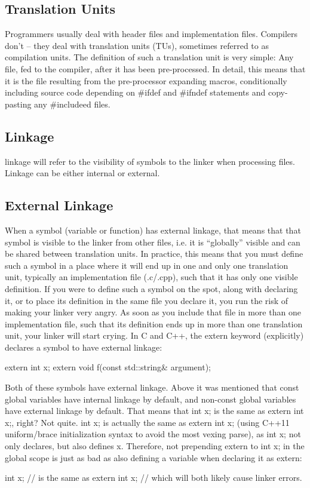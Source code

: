 \documentclass{report}
\begin{document}
\begin{concept}
    \bigbreak \noindent 
    \subsection{Translation Units}
    \bigbreak \noindent 
    Programmers usually deal with header files and implementation files. Compilers don’t – they deal with translation units (TUs), sometimes referred to as compilation units. The definition of such a translation unit is very simple: Any file, fed to the compiler, after it has been pre-processed. In detail, this means that it is the file resulting from the pre-processor expanding macros, conditionally including source code depending on #ifdef and \#ifndef statements and copy-pasting any \#includeed files.
    \bigbreak \noindent 
    \subsection{Linkage}
    \bigbreak \noindent 
    linkage will refer to the visibility of symbols to the linker when processing files. Linkage can be either internal or external.
    \bigbreak \noindent 
    \subsection{External Linkage}
    \bigbreak \noindent 
    When a symbol (variable or function) has external linkage, that means that that symbol is visible to the linker from other files, i.e. it is “globally” visible and can be shared between translation units. In practice, this means that you must define such a symbol in a place where it will end up in one and only one translation unit, typically an implementation file (.c/.cpp), such that it has only one visible definition. If you were to define such a symbol on the spot, along with declaring it, or to place its definition in the same file you declare it, you run the risk of making your linker very angry. As soon as you include that file in more than one implementation file, such that its definition ends up in more than one translation unit, your linker will start crying.
    \bigbreak \noindent 
    In C and C++, the extern keyword (explicitly) declares a symbol to have external linkage:
    \bigbreak \noindent 
    \begin{cppcode}
    extern int x;
    extern void f(const std::string& argument);
    \end{cppcode}
    \bigbreak \noindent 
    Both of these symbols have external linkage. Above it was mentioned that const global variables have internal linkage by default, and non-const global variables have external linkage by default. That means that int x; is the same as extern int x;, right? Not quite. int x; is actually the same as extern int x{}; (using C++11 uniform/brace initialization syntax to avoid the most vexing parse), as int x; not only declares, but also defines x. Therefore, not prepending extern to int x; in the global scope is just as bad as also defining a variable when declaring it as extern:
    \bigbreak \noindent 
    \begin{cppcode}
        int x;          // is the same as
        extern int x{}; // which will both likely cause linker errors.


\end{cppcode}
\end{concept}
\end{document}

